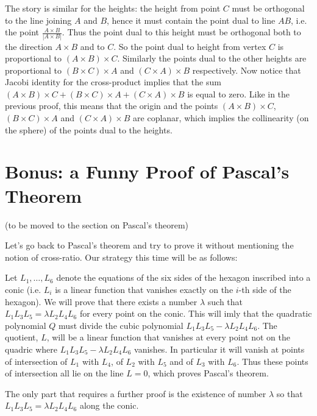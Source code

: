 The story is similar for the heights: the height from point $C$ must be orthogonal to the line joining $A$ and $B$, hence it must contain the point dual to line $AB$, i.e. the point $\frac{A\times B}{|A\times B|}$. Thus the point dual to this height must be orthogonal both to the direction $A\times B$ and to $C$. So the point dual to height from vertex $C$ is proportional to $(A\times B)\times C$. Similarly the points dual to the other heights are proportional to $(B\times C)\times A$ and $(C\times A)\times B$ respectively. Now notice that Jacobi identity for the cross-product implies that the sum $(A\times B)\times C+(B\times C)\times A+(C\times A)\times B$ is equal to zero. Like in the previous proof, this means that the origin and the points $(A\times B)\times C$, $(B\times C)\times A$ and $(C\times A)\times B$ are coplanar, which implies the collinearity (on the sphere) of the points dual to the heights.

\section{Bonus: a Funny Proof of Pascal's Theorem}

(to be moved to the section on Pascal's theorem)

Let's go back to Pascal's theorem and try to prove it without mentioning the notion of cross-ratio. Our strategy this time will be as follows:

Let $L_1,\ldots,L_6$ denote the equations of the six sides of the hexagon inscribed into a conic (i.e. $L_i$ is a linear function that vanishes exactly on the $i$-th side of the hexagon). We will prove that there exists a number $\lambda$ such that $L_1 L_3 L_5 = \lambda L_2 L_4 L_6$ for every point on the conic. This will imly that the quadratic polynomial $Q$ must divide the cubic polynomial $L_1 L_3 L_5 - \lambda L_2 L_4 L_6$. The quotient, $L$, will be a linear function that vanishes at every point not on the quadric where $L_1 L_3 L_5 - \lambda L_2 L_4 L_6$ vanishes. In particular it will vanish at points of intersection of $L_1$ with $L_4$, of $L_2$ with $L_5$ and of $L_3$ with $L_6$. Thus these points of intersection all lie on the line $L=0$, which proves Pascal's theorem.

The only part that requires a further proof is the existence of number $\lambda$ so that $L_1 L_3 L_5 = \lambda L_2 L_4 L_6$ along the conic.

